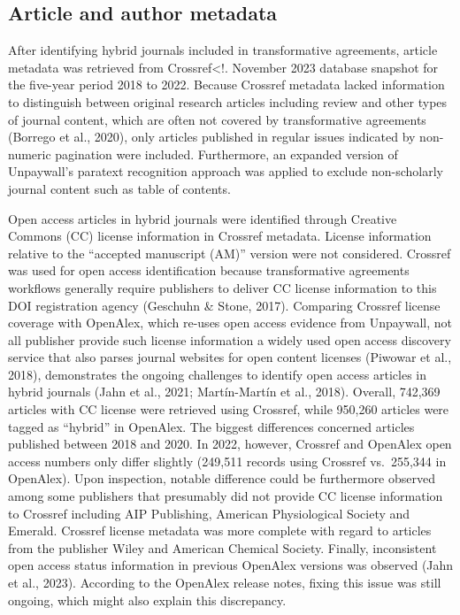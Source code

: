 \documentclass[a4paper,man,floatsintext,longtable,noextraspace,12pt]{apa6}
\begin{document}
\hypertarget{article-and-author-metadata}{%
\subsection{Article and author
metadata}\label{article-and-author-metadata}}

After identifying hybrid journals included in transformative agreements,
article metadata was retrieved from Crossref\textless!. November 2023
database snapshot for the five-year period 2018 to 2022. Because
Crossref metadata lacked information to distinguish between original
research articles including review and other types of journal content,
which are often not covered by transformative agreements (Borrego et
al., 2020), only articles published in regular issues indicated by
non-numeric pagination were included. Furthermore, an expanded version
of Unpaywall's paratext recognition approach was applied to exclude
non-scholarly journal content such as table of contents.

Open access articles in hybrid journals were identified through Creative
Commons (CC) license information in Crossref metadata. License
information relative to the ``accepted manuscript (AM)'' version were
not considered. Crossref was used for open access identification because
transformative agreements workflows generally require publishers to
deliver CC license information to this DOI registration agency (Geschuhn
\& Stone, 2017). Comparing Crossref license coverage with OpenAlex,
which re-uses open access evidence from Unpaywall, not all publisher
provide such license information a widely used open access discovery
service that also parses journal websites for open content licenses
(Piwowar et al., 2018), demonstrates the ongoing challenges to identify
open access articles in hybrid journals (Jahn et al., 2021;
Martín-Martín et al., 2018). Overall, 742,369 articles with CC license
were retrieved using Crossref, while 950,260 articles were tagged as
``hybrid'' in OpenAlex. The biggest differences concerned articles
published between 2018 and 2020. In 2022, however, Crossref and OpenAlex
open access numbers only differ slightly (249,511 records using Crossref
vs.~255,344 in OpenAlex). Upon inspection, notable difference could be
furthermore observed among some publishers that presumably did not
provide CC license information to Crossref including AIP Publishing,
American Physiological Society and Emerald. Crossref license metadata
was more complete with regard to articles from the publisher Wiley and
American Chemical Society. Finally, inconsistent open access status
information in previous OpenAlex versions was observed (Jahn et al.,
2023). According to the OpenAlex release notes, fixing this issue was
still ongoing, which might also explain this discrepancy.
\end{document}
